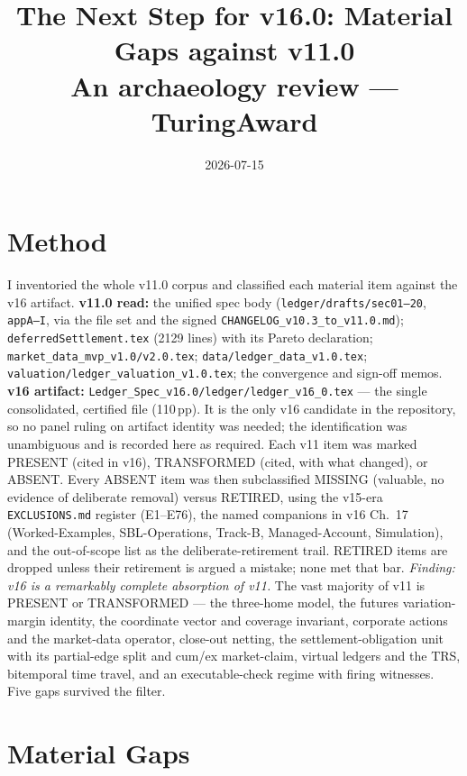 \documentclass[11pt]{article}
\title{\vspace{-3.5em}The Next Step for v16.0: Material Gaps against v11.0\\[2pt]
\large An archaeology review --- TuringAward}
\author{}
\date{2026-07-15}
\begin{document}
\maketitle
\vspace{-3em}

\section{Method}
I inventoried the whole v11.0 corpus and classified each material item against the v16
artifact. \textbf{v11.0 read:} the unified spec body (\texttt{ledger/drafts/sec01--20},
\texttt{appA--I}, via the file set and the signed \texttt{CHANGELOG\_v10.3\_to\_v11.0.md});
\texttt{deferredSettlement.tex} (2129 lines) with its Pareto declaration;
\texttt{market\_data\_mvp\_v1.0/v2.0.tex}; \texttt{data/ledger\_data\_v1.0.tex};
\texttt{valuation/ledger\_valuation\_v1.0.tex}; the convergence and sign-off memos.
\textbf{v16 artifact:} \texttt{Ledger\_Spec\_v16.0/ledger/ledger\_v16\_0.tex} --- the single
consolidated, certified file (110\,pp). It is the only v16 candidate in the repository, so no
panel ruling on artifact identity was needed; the identification was unambiguous and is
recorded here as required. Each v11 item was marked PRESENT (cited in v16), TRANSFORMED
(cited, with what changed), or ABSENT. Every ABSENT item was then subclassified MISSING
(valuable, no evidence of deliberate removal) versus RETIRED, using the v15-era
\texttt{EXCLUSIONS.md} register (E1--E76), the named companions in v16 Ch.~17
(Worked-Examples, SBL-Operations, Track-B, Managed-Account, Simulation), and the out-of-scope
list as the deliberate-retirement trail. RETIRED items are dropped unless their retirement is
argued a mistake; none met that bar. \emph{Finding: v16 is a remarkably complete absorption of
v11.} The vast majority of v11 is PRESENT or TRANSFORMED --- the three-home model, the futures
variation-margin identity, the coordinate vector and coverage invariant, corporate actions and
the market-data operator, close-out netting, the settlement-obligation unit with its
partial-edge split and cum/ex market-claim, virtual ledgers and the TRS, bitemporal time
travel, and an executable-check regime with firing witnesses. Five gaps survived the filter.

\section{Material Gaps}
\end{document}
